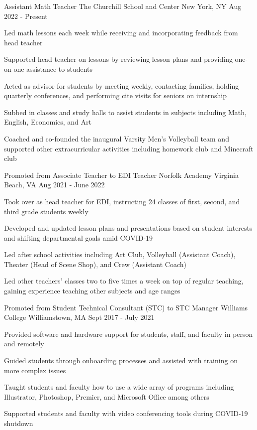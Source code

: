 \begin{cventries}
  \cventry
  {Assistant Math Teacher}
  {The Churchill School and Center}
  {New York, NY}
  {Aug 2022 - Present}
  {
    \begin{cvitems}
      \item {Led math lessons each week while receiving and incorporating feedback from head teacher}
      \item {Supported head teacher on lessons by reviewing lesson plans and providing one-on-one assistance to students}
      \item {Acted as advisor for students by meeting weekly, contacting families, holding quarterly conferences, and performing cite visits for seniors on internship}
      \item {Subbed in classes and study halls to assist students in subjects including Math, English, Economics, and Art}
      \item {Coached and co-founded the inaugural Varsity Men's Volleyball team and supported other extracurricular activities including homework club and Minecraft club}
    \end{cvitems}
  }

  \cventry
  {Promoted from Associate Teacher to EDI Teacher}
  {Norfolk Academy}
  {Virginia Beach, VA}
  {Aug 2021 - June 2022}
  {
    \begin{cvitems}
      \item {Took over as head teacher for EDI, instructing 24 classes of first, second, and third grade students weekly}
      \item {Developed and updated lesson plans and presentations based on student interests and shifting departmental goals amid COVID-19}
      \item {Led after school activities including Art Club, Volleyball (Assistant Coach), Theater (Head of Scene Shop), and Crew (Assistant Coach)}
      \item {Led other teachers' classes two to five times a week on top of regular teaching, gaining experience teaching other subjects and age ranges}
    \end{cvitems}
  }

  \cventry
  {Promoted from Student Technical Consultant (STC) to STC Manager}
  {Williams College}
  {Williamstown, MA}
  {Sept 2017 - July 2021}
  {
    \begin{cvitems}
      \item {Provided software and hardware support for students, staff, and faculty in person and remotely}
      \item {Guided students through onboarding processes and assisted with training on more complex issues}
      \item {Taught students and faculty how to use a wide array of programs including Illustrator, Photoshop, Premier, and Microsoft Office among others}
      \item {Supported students and faculty with video conferencing tools during COVID-19 shutdown}
    \end{cvitems}
  }


\end{cventries}
